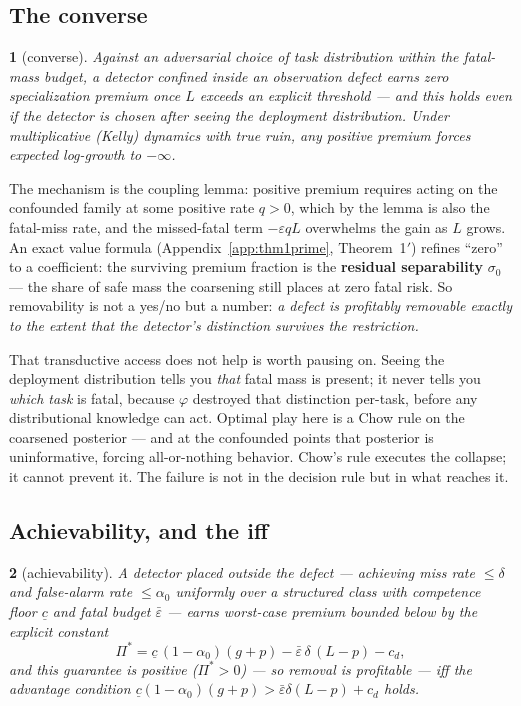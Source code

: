 \documentclass[11pt]{article}
\theoremstyle{plain}
\newtheorem*{namedthminner}{\namedthmname}
\newenvironment{nthm}[1]{\def\namedthmname{#1}\begin{namedthminner}}{\end{namedthminner}}
\theoremstyle{definition}
\begin{document}
\subsection{The converse}\label{sec:converse}

\begin{nthm}{Theorem 1}[converse]
Against an adversarial choice of task distribution
within the fatal-mass budget, a detector confined inside an observation defect
earns zero specialization premium once $L$ exceeds an explicit threshold --- and
this holds even if the detector is chosen after seeing the deployment
distribution. Under multiplicative (Kelly) dynamics with true ruin, any
positive premium forces expected log-growth to $-\infty$.
\end{nthm}

The mechanism is the coupling lemma: positive premium requires acting on the
confounded family at some positive rate $q > 0$, which by the lemma is also
the fatal-miss rate, and the missed-fatal term $-\varepsilon q L$ overwhelms
the gain as $L$ grows. An exact value formula (Appendix~\ref{app:thm1prime}, Theorem~1$'$) refines
``zero'' to a coefficient: the surviving premium fraction is the \textbf{residual
separability} $\sigma_0$ --- the share of safe mass the coarsening still places
at zero fatal risk. So removability is not a yes/no but a number: \emph{a defect is
profitably removable exactly to the extent that the detector's distinction
survives the restriction.}

That transductive access does not help is worth pausing on. Seeing the
deployment distribution tells you \emph{that} fatal mass is present; it never tells
you \emph{which task} is fatal, because $\varphi$ destroyed that distinction
per-task, before any distributional knowledge can act. Optimal play here is a
Chow rule on the coarsened posterior --- and at the confounded points that
posterior is uninformative, forcing all-or-nothing behavior. Chow's rule
executes the collapse; it cannot prevent it. The failure is not in the
decision rule but in what reaches it.

\subsection{Achievability, and the iff}\label{sec:achievability}

\begin{nthm}{Theorem A}[achievability]
A detector placed outside the defect ---
achieving miss rate $\leq \delta$ and false-alarm rate $\leq \alpha_0$
uniformly over a structured class with competence floor $\underline c$ and
fatal budget $\bar\varepsilon$ --- earns worst-case premium bounded below by the
explicit constant
$$\Pi^* = \underline c\,(1-\alpha_0)(g+p) - \bar\varepsilon\,\delta\,(L-p) - c_d,$$
and this guarantee is positive ($\Pi^* > 0$) --- so removal is profitable ---
iff the advantage
condition $\underline c(1-\alpha_0)(g+p) > \bar\varepsilon\delta(L-p) + c_d$
holds.
\end{nthm}
\end{document}
